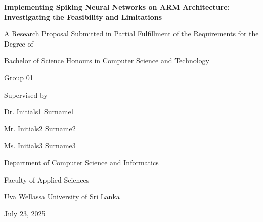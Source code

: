 \documentclass[a4paper,12pt]{article}
\begin{document}
	
	\begin{titlepage}
		\centering
		\vspace*{1cm}
		{\Large\bfseries Implementing Spiking Neural Networks on ARM Architecture: Investigating the Feasibility and Limitations \par}
		\vspace{1cm}
		{\normalsize A Research Proposal Submitted in Partial Fulfillment of the Requirements for the Degree of \par}
		{\normalsize Bachelor of Science Honours in Computer Science and Technology \par}
		\vspace{0.5cm}
		{\normalsize Group 01 \par}
		\vspace{0.5cm}
		{\normalsize Supervised by \par}
		{\normalsize Dr. Initials1 Surname1 \par}
		{\normalsize Mr. Initials2 Surname2 \par}
		{\normalsize Ms. Initials3 Surname3 \par}
		\vspace{0.5cm}
		{\normalsize Department of Computer Science and Informatics \par}
		{\normalsize Faculty of Applied Sciences \par}
		{\normalsize Uva Wellassa University of Sri Lanka \par}
		\vspace{0.5cm}
		{\normalsize July 23, 2025 \par}
	\end{titlepage}
	
\end{document}
